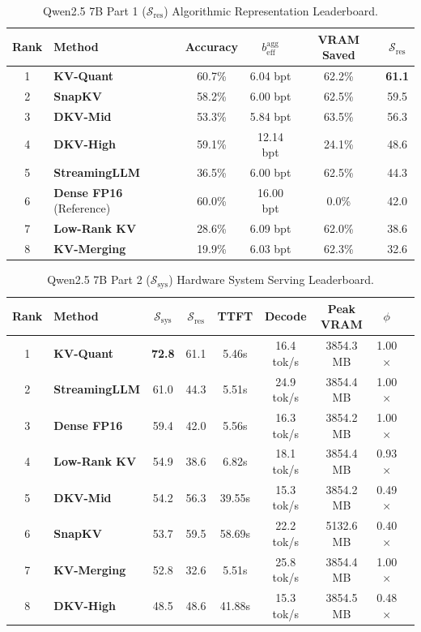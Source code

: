\documentclass[10pt]{article}
\theoremstyle{definition}
\begin{document}
\begin{table}[h]
\vspace{6pt}
\centering
\small
\caption{Qwen2.5 7B Part 1 ($\mathcal{S}_{\text{res}}$) Algorithmic Representation Leaderboard.}
\label{tab:q7b_sres}
\begin{tabular}{clcccc}
\toprule
\textbf{Rank} & \textbf{Method} & \textbf{Accuracy} & $b_{\text{eff}}^{\text{agg}}$ & \textbf{VRAM Saved} & $\mathcal{S}_{\text{res}}$ \\
\midrule
1 & \textbf{KV-Quant} & 60.7\% & 6.04 bpt & 62.2\% & \textbf{61.1} \\
2 & \textbf{SnapKV} & 58.2\% & 6.00 bpt & 62.5\% & 59.5 \\
3 & \textbf{DKV-Mid} & 53.3\% & 5.84 bpt & 63.5\% & 56.3 \\
4 & \textbf{DKV-High} & 59.1\% & 12.14 bpt & 24.1\% & 48.6 \\
5 & \textbf{StreamingLLM} & 36.5\% & 6.00 bpt & 62.5\% & 44.3 \\
6 & \textbf{Dense FP16} (Reference) & 60.0\% & 16.00 bpt & 0.0\% & 42.0 \\
7 & \textbf{Low-Rank KV} & 28.6\% & 6.09 bpt & 62.0\% & 38.6 \\
8 & \textbf{KV-Merging} & 19.9\% & 6.03 bpt & 62.3\% & 32.6 \\
\bottomrule
\end{tabular}
\end{table}

\begin{table}[h]
\vspace{6pt}
\centering
\small
\caption{Qwen2.5 7B Part 2 ($\mathcal{S}_{\text{sys}}$) Hardware System Serving Leaderboard.}
\label{tab:q7b_ssys}
\begin{tabular}{clccccccc}
\toprule
\textbf{Rank} & \textbf{Method} & $\mathcal{S}_{\text{sys}}$ & $\mathcal{S}_{\text{res}}$ & \textbf{TTFT} & \textbf{Decode} & \textbf{Peak VRAM} & $\phi$ \\
\midrule
1 & \textbf{KV-Quant} & \textbf{72.8} & 61.1 & 5.46s & 16.4 tok/s & 3854.3 MB & 1.00$\times$ \\
2 & \textbf{StreamingLLM} & 61.0 & 44.3 & 5.51s & 24.9 tok/s & 3854.4 MB & 1.00$\times$ \\
3 & \textbf{Dense FP16} & 59.4 & 42.0 & 5.56s & 16.3 tok/s & 3854.2 MB & 1.00$\times$ \\
4 & \textbf{Low-Rank KV} & 54.9 & 38.6 & 6.82s & 18.1 tok/s & 3854.4 MB & 0.93$\times$ \\
5 & \textbf{DKV-Mid} & 54.2 & 56.3 & 39.55s & 15.3 tok/s & 3854.2 MB & 0.49$\times$ \\
6 & \textbf{SnapKV} & 53.7 & 59.5 & 58.69s & 22.2 tok/s & 5132.6 MB & 0.40$\times$ \\
7 & \textbf{KV-Merging} & 52.8 & 32.6 & 5.51s & 25.8 tok/s & 3854.4 MB & 1.00$\times$ \\
8 & \textbf{DKV-High} & 48.5 & 48.6 & 41.88s & 15.3 tok/s & 3854.5 MB & 0.48$\times$ \\
\bottomrule
\end{tabular}
\end{table}
\end{document}
